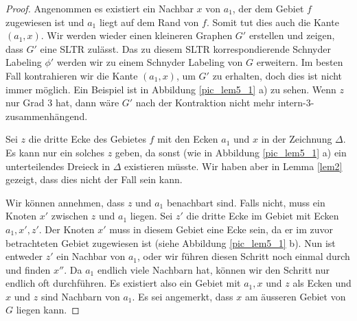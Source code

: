\begin{proof}
Angenommen es existiert ein Nachbar $x$ von $a_1$, der dem Gebiet $f$ zugewiesen ist und $a_1$ liegt auf dem Rand von $f$. Somit tut dies auch die Kante $(a_1,x)$. Wir werden wieder einen kleineren Graphen $G'$ erstellen und zeigen, dass $G'$ eine SLTR zulässt. Das zu diesem SLTR korrespondierende Schnyder Labeling $\phi'$ werden wir zu einem Schnyder Labeling von $G$ erweitern. Im besten Fall kontrahieren wir die Kante $(a_1,x)$, um $G'$ zu erhalten, doch dies ist nicht immer möglich. Ein Beispiel ist in Abbildung \ref{pic_lem5_1} a) zu sehen. Wenn $z$ nur Grad 3 hat, dann wäre $G'$ nach der Kontraktion nicht mehr intern-3-zusammenhängend.

Sei $z$ die dritte Ecke des Gebietes $f$ mit den Ecken $a_1$ und $x$ in der Zeichnung $\Delta$. Es kann nur ein solches $z$ geben, da sonst (wie in Abbildung \ref{pic_lem5_1} a) ein unterteilendes Dreieck in $\Delta$ existieren müsste. Wir haben aber in Lemma \ref{lem2} gezeigt, dass dies nicht der Fall sein kann.

Wir können annehmen, dass $z$ und $a_1$ benachbart sind. Falls nicht, muss ein Knoten $x'$ zwischen $z$ und $a_1$ liegen. Sei $z'$ die dritte Ecke im Gebiet mit Ecken $a_1,x',z'$. Der Knoten $x'$ muss in diesem Gebiet eine Ecke sein, da er im zuvor betrachteten Gebiet zugewiesen ist (siehe Abbildung \ref{pic_lem5_1} b). Nun ist entweder $z'$ ein Nachbar von $a_1$, oder wir führen diesen Schritt noch einmal durch und finden $x''$. Da $a_1$ endlich viele Nachbarn hat, können wir den Schritt nur endlich oft durchführen. Es existiert also ein Gebiet mit $a_1, x$ und $z$ als Ecken und $x$ und $z$ sind Nachbarn von $a_1$. Es sei angemerkt, dass $x$ am äusseren Gebiet von $G$ liegen kann.


\end{proof}
